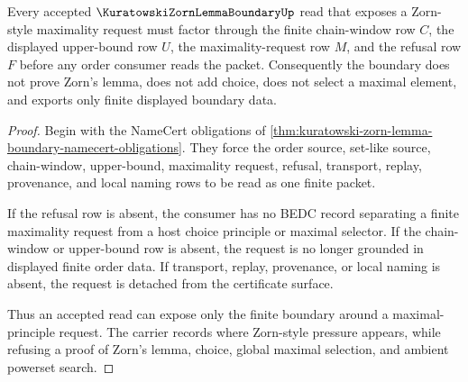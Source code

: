 \begin{theorem}
\label{thm:kuratowski-zorn-lemma-boundary-choice-refusal}
Every accepted $\KuratowskiZornLemmaBoundaryUp$ read that exposes a Zorn-style maximality request must factor through the finite chain-window row $C$, the displayed upper-bound row $U$, the maximality-request row $M$, and the refusal row $F$ before any order consumer reads the packet. Consequently the boundary does not prove Zorn's lemma, does not add choice, does not select a maximal element, and exports only finite displayed boundary data.
\end{theorem}
\begin{proof}
Begin with the NameCert obligations of \autoref{thm:kuratowski-zorn-lemma-boundary-namecert-obligations}. They force the order source, set-like source, chain-window, upper-bound, maximality request, refusal, transport, replay, provenance, and local naming rows to be read as one finite packet.

If the refusal row is absent, the consumer has no BEDC record separating a finite maximality request from a host choice principle or maximal selector. If the chain-window or upper-bound row is absent, the request is no longer grounded in displayed finite order data. If transport, replay, provenance, or local naming is absent, the request is detached from the certificate surface.

Thus an accepted read can expose only the finite boundary around a maximal-principle request. The carrier records where Zorn-style pressure appears, while refusing a proof of Zorn's lemma, choice, global maximal selection, and ambient powerset search.
\end{proof}




